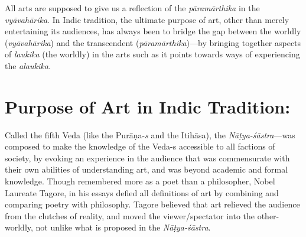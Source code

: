 All arts are supposed to give us a reflection of the \textsl{pāramārthika} in the \textsl{vyāvahārika}. In Indic tradition, the ultimate purpose of art, other than merely entertaining its audiences, has always been to bridge the gap between the worldly (\textsl{vyāvahārika}) and the transcendent (\textsl{pāramārthika})---by bringing together aspects of \textsl{laukika} (the worldly) in the arts such as it points towards ways of experiencing the \textsl{alaukika.}

\section*{Purpose of Art in Indic Tradition:}

Called the fifth Veda (like the Purāṇa-\textsl{s} and the Itihāsa), the \textsl{Nāṭya-śāstra}---was composed to make the knowledge of the \hbox{Veda-s} accessible to all factions of society, by evoking an experience in the audience that was commensurate with their own abilities of understanding art, and was beyond academic and formal knowledge. Though remembered more as a poet than a philosopher, Nobel Laureate Tagore, in his essays defied all definitions of art by combining and comparing poetry with philosophy. Tagore believed that art relieved the audience from the clutches of reality, and moved the viewer/spectator into the other-worldly, not unlike what is proposed in the \textsl{Nāṭya-śāstra}. 

